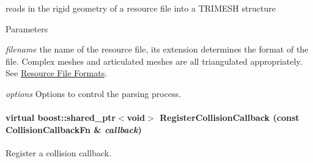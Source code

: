 reads in the rigid geometry of a resource file into a TRIMESH structure 


\begin{DoxyParams}{Parameters}
\item[{\em filename}]the name of the resource file, its extension determines the format of the file. Complex meshes and articulated meshes are all triangulated appropriately. See \hyperlink{architecture__concepts_supported_formats}{Resource File Formats}. \item[{\em options}]Options to control the parsing process. \end{DoxyParams}
\hypertarget{classOpenRAVE_1_1EnvironmentBase_a04548c3dc0b848f82c493a27ce85aedc}{
\paragraph[{RegisterCollisionCallback}]{\setlength{\rightskip}{0pt plus 5cm}virtual boost::shared\_\-ptr$<$void$>$ RegisterCollisionCallback (const CollisionCallbackFn \& {\em callback})}\hfill}
\label{classOpenRAVE_1_1EnvironmentBase_a04548c3dc0b848f82c493a27ce85aedc}
Register a collision callback.

